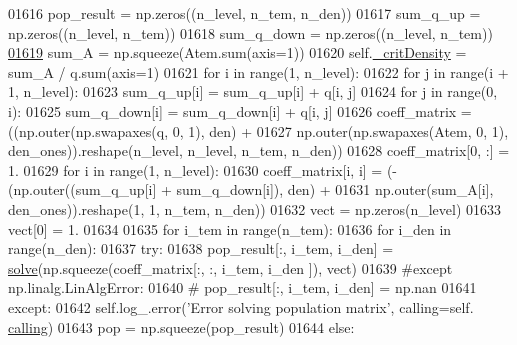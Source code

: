 \begin{DoxyCode}
01616             pop\_result = np.zeros((n\_level, n\_tem, n\_den))
01617             sum\_q\_up = np.zeros((n\_level, n\_tem))
01618             sum\_q\_down = np.zeros((n\_level, n\_tem))
\hypertarget{classpyneb_1_1core_1_1pynebcore_1_1_atom_l01619}{}\hyperlink{classpyneb_1_1core_1_1pynebcore_1_1_atom_a1d0823a36ca030fd149522fe72908631}{01619}             sum\_A = np.squeeze(Atem.sum(axis=1))
01620             self.\hyperlink{classpyneb_1_1core_1_1pynebcore_1_1_atom_a1d0823a36ca030fd149522fe72908631}{\_critDensity} = sum\_A / q.sum(axis=1)
01621             \textcolor{keywordflow}{for} i \textcolor{keywordflow}{in} range(1, n\_level):
01622                 \textcolor{keywordflow}{for} j \textcolor{keywordflow}{in} range(i + 1, n\_level):
01623                     sum\_q\_up[i] = sum\_q\_up[i] + q[i, j]
01624                 \textcolor{keywordflow}{for} j \textcolor{keywordflow}{in} range(0, i):
01625                     sum\_q\_down[i] = sum\_q\_down[i] + q[i, j]
01626             coeff\_matrix = ((np.outer(np.swapaxes(q, 0, 1), den) + 
01627                              np.outer(np.swapaxes(Atem, 0, 1), den\_ones)).reshape(n\_level, n\_level, n\_tem, 
      n\_den))
01628             coeff\_matrix[0, :] = 1.
01629             \textcolor{keywordflow}{for} i \textcolor{keywordflow}{in} range(1, n\_level):
01630                 coeff\_matrix[i, i] = (-(np.outer((sum\_q\_up[i] + sum\_q\_down[i]), den) + 
01631                                         np.outer(sum\_A[i], den\_ones)).reshape(1, 1, n\_tem, n\_den))
01632             vect = np.zeros(n\_level)
01633             vect[0] = 1.
01634     
01635             \textcolor{keywordflow}{for} i\_tem \textcolor{keywordflow}{in} range(n\_tem):
01636                 \textcolor{keywordflow}{for} i\_den \textcolor{keywordflow}{in} range(n\_den):
01637                     \textcolor{keywordflow}{try}:
01638                         pop\_result[:, i\_tem, i\_den] = \hyperlink{namespacepyneb_1_1utils_1_1misc_aa5d9daf83958e9b6bd123954d495e94c}{solve}(np.squeeze(coeff\_matrix[:, :, i\_tem, i\_den
      ]), vect)
01639                     \textcolor{comment}{#except np.linalg.LinAlgError:}
01640                     \textcolor{comment}{#    pop\_result[:, i\_tem, i\_den] = np.nan}
01641                     \textcolor{keywordflow}{except}:
01642                         self.log\_.error(\textcolor{stringliteral}{'Error solving population matrix'}, calling=self.
      \hyperlink{classpyneb_1_1core_1_1pynebcore_1_1_atom_a373b7735acf4f528b54bddf373ad67a1}{calling})
01643             pop = np.squeeze(pop\_result)
01644         \textcolor{keywordflow}{else}:

\end{DoxyCode}
